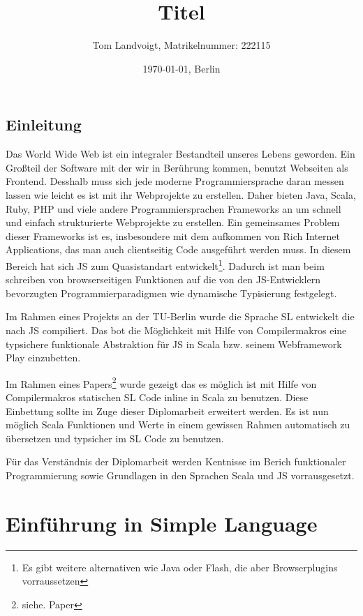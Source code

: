 \documentclass[12pt,a4paper]{report}
\title{Titel}
\author{Tom Landvoigt, Matrikelnummer: 222115}
\date{\today{}, Berlin}
\begin{document}
\maketitle
\tableofcontents

\newpage

\lstset{basicstyle=\ttfamily\scriptsize, numbers=left, numberstyle=\tiny}

\section{Einleitung}

Das World Wide Web ist ein integraler Bestandteil unseres Lebens geworden. Ein Großteil der Software mit der wir in Berührung kommen, benutzt Webseiten als Frontend. Desshalb muss sich jede moderne Programmiersprache daran messen lassen wie leicht es ist mit ihr Webprojekte zu erstellen. Daher bieten Java, Scala, Ruby, PHP und viele andere Programmiersprachen Frameworks an um schnell und einfach strukturierte Webprojekte zu erstellen. Ein gemeinsames Problem dieser Frameworks ist es, insbesondere mit dem aufkommen von Rich Internet Applications, das man auch clientseitig Code ausgeführt werden muss. In diesem Bereich hat sich \ac{JS} zum Quasistandart entwickelt\footnote{Es gibt weitere alternativen wie Java oder Flash, die aber Browserplugins vorraussetzen}. Dadurch ist man beim schreiben von browserseitigen Funktionen auf die von den \ac{JS}-Entwicklern bevorzugten Programmierparadigmen wie dynamische Typisierung festgelegt.

Im Rahmen eines Projekts an der TU-Berlin wurde die Sprache \ac{SL} entwickelt die nach \ac{JS} compiliert. Das bot die Möglichkeit mit Hilfe von Compilermakros eine typsichere funktionale Abstraktion für \ac{JS} in Scala bzw. seinem Webframework Play einzubetten.

Im Rahmen eines Papers\footnote{siehe. Paper} wurde gezeigt das es möglich ist mit Hilfe von Compilermakros statischen \ac{SL} Code inline in Scala zu benutzen. Diese Einbettung sollte im Zuge dieser Diplomarbeit erweitert werden. Es ist nun möglich Scala Funktionen und Werte in einem gewissen Rahmen automatisch zu übersetzen und typsicher im \ac{SL} Code zu benutzen.

Für das Verständnis der Diplomarbeit werden Kentnisse im Berich funktionaler Programmierung sowie Grundlagen in den Sprachen Scala und \ac{JS} vorrausgesetzt.

\chapter{ Einführung in Simple Language}
\end{document}
